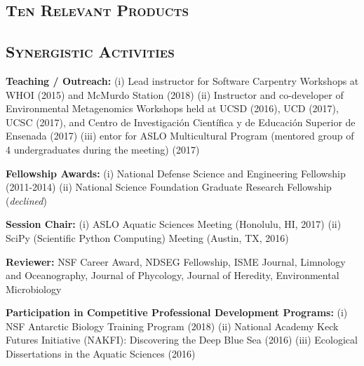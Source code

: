 \documentclass[svgnames,11pt]{article}
\begin{document}
\subsection*{\textsc{Ten Relevant Products}}
\vspace*{-1cm}
\renewcommand\refname{}

 \nocite{Hu2018, Rouco2018, Haley2017, Harke2017, Moniruzzaman2017, Caron2016, Alexander2015a, Alexander2015, Alexander2012, Dyhrman2012}



\subsection*{\textsc{Synergistic Activities}}

\begin{bibenum}[itemsep=4pt]

    \item \textbf{Teaching / Outreach:} (i) Lead instructor for Software Carpentry Workshops at WHOI (2015) and McMurdo Station (2018) (ii) Instructor and co-developer of Environmental Metagenomics Workshops held at UCSD (2016), UCD (2017), UCSC (2017), and Centro de Investigaci\'{o}n Cient\'{i}fica y de Educaci\'{o}n Superior de Ensenada (2017) (iii) entor for ASLO Multicultural Program (mentored group of 4 undergraduates during the meeting) (2017)

    \item \textbf{Fellowship Awards:} (i) National Defense Science and Engineering Fellowship (2011-2014) (ii) National Science Foundation Graduate Research Fellowship (\textit{declined})

    \item \textbf{Session Chair:} (i) ASLO Aquatic Sciences Meeting (Honolulu, HI, 2017) (ii) SciPy (Scientific Python Computing) Meeting (Austin, TX, 2016)

    \item \textbf{Reviewer:} NSF Career Award, NDSEG Fellowship, ISME Journal, Limnology and Oceanography, Journal of Phycology, Journal of Heredity, Environmental Microbiology

    \item \textbf{Participation in Competitive Professional Development Programs:}
    (i) NSF Antarctic Biology Training Program (2018) (ii) National Academy Keck Futures Initiative (NAKFI): Discovering the Deep Blue Sea (2016) (iii)  Ecological Dissertations in the Aquatic Sciences (2016)

\end{bibenum}
\end{document}
